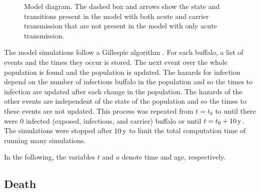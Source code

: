 \documentclass[12pt, UKenglish]{article}  %
\begin{document}
\begin{figure}
  \centering
  \textsf{}
  \caption{Model diagram. The dashed box and arrows show the
    state and transitions present in the model with both acute and
    carrier transmission that are not present in the model with only
    acute transmission.}
  \label{fig:diagram}
\end{figure}


The model simulations follow a Gillespie algorithm
\autocite{gillespie_1977}. For each buffalo, a list of events and the
times they occur is stored. The next event over the whole population
is found and the population is updated.  The hazards for infection
depend on the number of infectious buffalo in the population and so
the times to infection are updated after each change in the
population.  The hazards of the other events are independent of the
state of the population and so the times to these events are not
updated.  This process was repeated from $t = t_0$ to until there were
$0$ infected (exposed, infectious, and carrier) buffalo or until
$t = t_0 + \unit[10]{y}$. The simulations were stopped after
$\unit[10]{y}$ to limit the total computation time of running many
simulations.

In the following, the variables $t$ and $a$ denote time and age,
respectively.

\subsection{Death}
\end{document}

